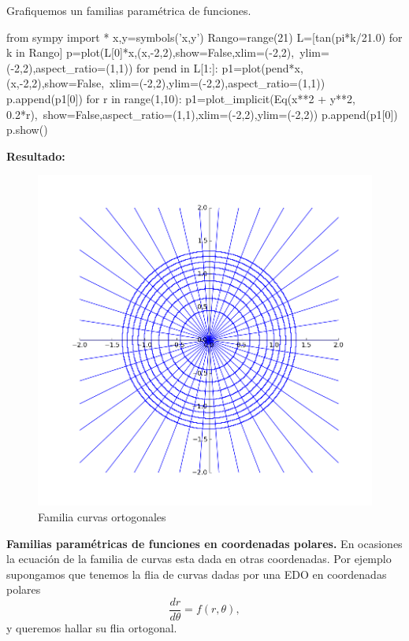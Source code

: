 \begin{ejemplo}{}Grafiquemos un familias paramétrica de funciones.

\end{ejemplo}



\begin{pyverbatim}
from sympy import *
x,y=symbols('x,y')
Rango=range(21)
L=[tan(pi*k/21.0) for k in Rango] 
p=plot(L[0]*x,(x,-2,2),show=False,xlim=(-2,2),\
ylim=(-2,2),aspect_ratio=(1,1))
for pend in L[1:]:
    p1=plot(pend*x,(x,-2,2),show=False,\
xlim=(-2,2),ylim=(-2,2),aspect_ratio=(1,1))
    p.append(p1[0])
for r in range(1,10):
    p1=plot_implicit(Eq(x**2 + y**2, 0.2*r),\
show=False,aspect_ratio=(1,1),xlim=(-2,2),ylim=(-2,2))
    p.append(p1[0])
p.show()
\end{pyverbatim}


\noindent\textbf{Resultado:}
\begin{figure}[h]
\begin{center}
\includegraphics[scale=.2]{imagenes/flia_curvas_ortogonales.png}
\end{center}
\caption{Familia curvas ortogonales}\label{fig:ortogonales}
\end{figure}


\begin{mdframed}[style=MiEstilo]\relax%
\textbf{Familias paramétricas de funciones en coordenadas polares.}
En ocasiones la ecuación de la familia de curvas esta dada en otras coordenadas. Por ejemplo supongamos que tenemos la flia de curvas dadas por una EDO en coordenadas polares
\[\frac{dr}{d\theta}=f(r,\theta)\label{eq:flia_curvas_polar},\]
y queremos hallar su flia ortogonal.
 
\end{mdframed}


